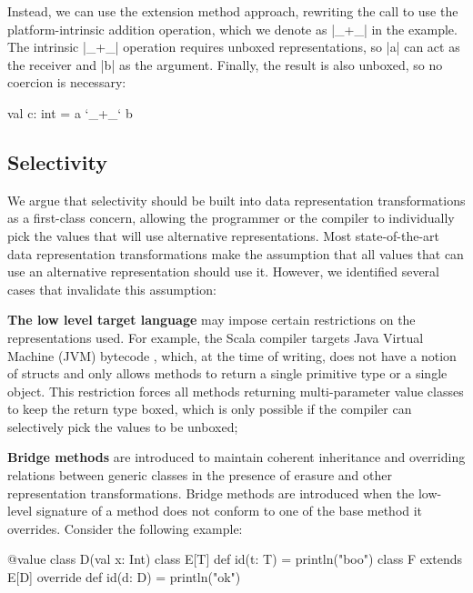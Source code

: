 Instead, we can use the extension method approach, rewriting the call to use the platform-intrinsic  addition operation, which we denote as |_+_| in the example. The intrinsic |_+_| operation requires unboxed representations, so |a| can act as the receiver and |b| as the argument. Finally, the result is also unboxed, so no coercion is necessary:

\begin{lstlisting-nobreak}
 val c: int = a `_+_` b
\end{lstlisting-nobreak}

\subsection{Selectivity}
\label{sec:problem-oo/selectivity}

We argue that selectivity should be built into data representation transformations as a first-class concern, allowing the programmer or the compiler to individually pick the values that will use alternative representations. Most state-of-the-art data representation transformations make the assumption that all values that can use an alternative representation should use it. However, we identified several cases that invalidate this assumption:

\textbf{The low level target language} may impose certain restrictions on the representations used. For example, the Scala compiler targets Java Virtual Machine (JVM) bytecode \cite{java-spec}, which, at the time of writing, does not have a notion of structs and only allows methods to return a single primitive type or a single object. This restriction forces all methods returning multi-parameter value classes to keep the return type boxed, which is only possible if the compiler can selectively pick the values to be unboxed;

\textbf{Bridge methods} \cite{cartwright-nextgen} are introduced to maintain coherent inheritance and overriding relations between generic classes in the presence of erasure and other representation transformations. Bridge methods are introduced when the low-level signature of a method does not conform to one of the base method it overrides. Consider the following example:

\begin{lstlisting-nobreak}
 @value class D(val x: Int)
 class E[T] {
   def id(t: T) = println("boo")
 }
 class F extends E[D] {
   override def id(d: D) = println("ok")
 }
\end{lstlisting-nobreak}

